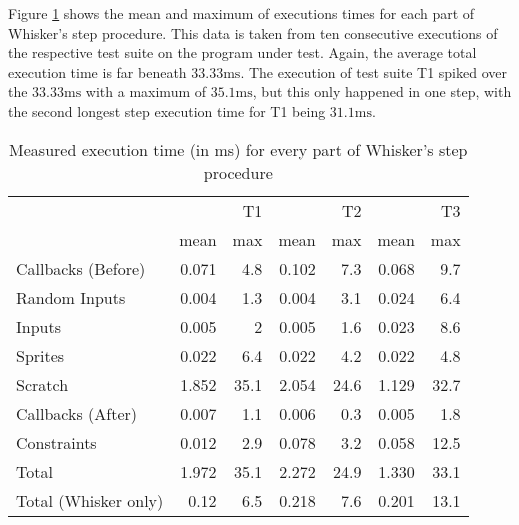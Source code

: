 Figure \ref{tab:time_measurements} shows the mean and maximum of executions times for each part of Whisker's step procedure.
This data is taken from ten consecutive executions of the respective test suite on the program under test.
Again, the average total execution time is far beneath $33.33\text{ms}$.
The execution of test suite T1 spiked over the $33.33\text{ms}$ with a maximum of $35.1\text{ms}$,
but this only happened in one step, with the second longest step execution time for T1 being $31.1\text{ms}$.

%

\begin{table}[htpb]
    \centering
    \footnotesize
    \begin{tabular}{l|rr|rr|rr}
        \toprule
                             &       & T1   &       & T2   &       & T3   \\
                             & mean  & max  & mean  & max  & mean  & max  \\
        \midrule
        Callbacks (Before)   & 0.071 & 4.8  & 0.102 & 7.3  & 0.068 & 9.7  \\
        Random Inputs        & 0.004 & 1.3  & 0.004 & 3.1  & 0.024 & 6.4  \\
        Inputs               & 0.005 & 2    & 0.005 & 1.6  & 0.023 & 8.6  \\
        Sprites              & 0.022 & 6.4  & 0.022 & 4.2  & 0.022 & 4.8  \\
        Scratch              & 1.852 & 35.1 & 2.054 & 24.6 & 1.129 & 32.7 \\
        Callbacks (After)    & 0.007 & 1.1  & 0.006 & 0.3  & 0.005 & 1.8  \\
        Constraints          & 0.012 & 2.9  & 0.078 & 3.2  & 0.058 & 12.5 \\
        \midrule
        Total                & 1.972 & 35.1 & 2.272 & 24.9 & 1.330 & 33.1 \\
        Total (Whisker only) & 0.12  & 6.5  & 0.218 & 7.6  & 0.201 & 13.1 \\
        \bottomrule
    \end{tabular}
    \caption{Measured execution time (in ms) for every part of Whisker's step procedure}
    \label{tab:time_measurements}
\end{table}

